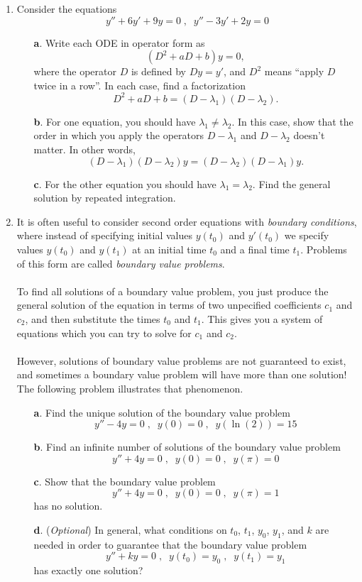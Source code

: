 \documentclass[10pt,psamsfonts,reqno,oneside,letterpaper]{amsart}
\begin{document}
\begin{enumerate}[I]
\item Consider the equations 
	\[ y'' + 6y' + 9y = 0 \; , \; \;  y'' - 3y' +2y = 0 \]
	\begin{enumerate}
		\item[\textbf{a}.] Write each ODE in operator form as 
		\[ (D^2 + aD + b)y = 0, \]
		where the operator $D$ is defined by $Dy = y'$, and $D^2$ means ``apply $D$ twice in a row''.  In each case, find a factorization
		\[ D^2 + aD + b = (D-\lambda_1)(D-\lambda_2). \]
		\item[\textbf{b}.] For one equation, you should have $\lambda_1 \neq \lambda_2$.  In this case, show that the order in which you apply the operators $D- \lambda_1$ and $D -\lambda_2$ doesn't matter.  In other words,
		\[ (D-\lambda_1)(D-\lambda_2)y = (D-\lambda_2)(D-\lambda_1)y. \]
		\item[\textbf{c}.] For the other equation you should have $\lambda_1 = \lambda_2$.  Find the general solution by repeated integration.
	\end{enumerate}
\item It is often useful to consider second order equations with \emph{boundary conditions}, where instead of specifying initial values $y(t_0)$ and $y'(t_0)$ we specify values $y(t_0)$ and $y(t_1)$ at an initial time $t_0$ and a final time $t_1$.  Problems of this form are called \emph{boundary value problems}. \\ \\
	To find all solutions of a boundary value problem, you just produce the general solution of the equation in terms of two unpecified coefficients $c_1$ and $c_2$, and then substitute the times $t_0$ and $t_1$.  This gives you a system of equations which you can try to solve for $c_1$ and $c_2$. \\ \\ 
	However, solutions of boundary value problems are not guaranteed to exist, and sometimes a boundary value problem will have more than one solution!   The following problem illustrates that phenomenon.
	\begin{enumerate}
		\item[\textbf{a}.] Find the unique solution of the boundary value problem
		\[ y'' - 4y = 0 \; , \; \; y(0) = 0 \; , \; \; y(\ln(2)) = 15 \] 
		\item[\textbf{b}.] Find an infinite number of solutions of the boundary value problem 
		\[ y'' + 4 y = 0 \; , \; \; y(0) = 0 \; , \; \; y(\pi) = 0 \]
		\item[\textbf{c}.] Show that the boundary value problem
		\[ y'' + 4 y = 0 \; , \; \; y(0) = 0 \; , \; \; y(\pi) = 1 \]
		has no solution.
		\item[\textbf{d}.] (\textit{Optional}) In general, what conditions on $t_0$, $t_1$, $y_0$, $y_1$, and $k$ are needed in order to guarantee that the boundary value problem
		\[ y'' + ky = 0 \; , \; \; y(t_0) = y_0 \; , \; \; y(t_1) = y_1 \]
		has exactly one solution? 
	\end{enumerate}
	

\end{enumerate}
\end{document}
